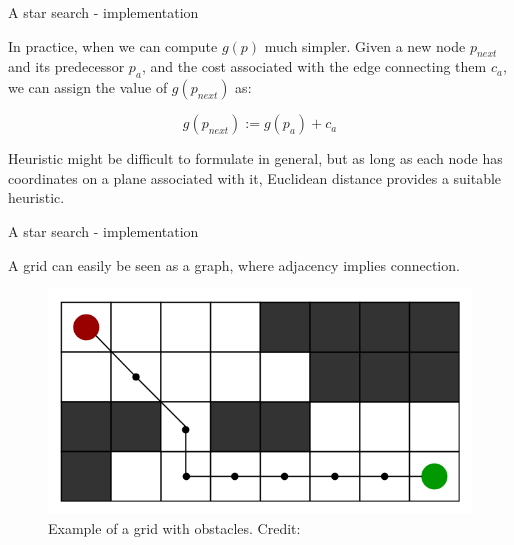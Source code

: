 \documentclass{beamer}
\begin{document}
\begin{frame}{A star search - implementation}
	\begin{flushleft}
		
		In practice, when we can compute $g(p)$ much simpler. Given a new node $p_{next}$ and its predecessor $p_a$, and the cost associated with the edge connecting them $c_a$, we can assign the value of $g(p_{next})$ as:
		
		\begin{equation}
			g(p_{next}) := g(p_a) + c_a
		\end{equation}
	
		Heuristic might be difficult to formulate in general, but as long as each node has coordinates on a plane associated with it, Euclidean distance provides a suitable heuristic.
		
	\end{flushleft}
\end{frame}



\begin{frame}{A star search - implementation}
	\begin{flushleft}
		
		A grid can easily be seen as a graph, where adjacency implies connection.
		
		\begin{figure}
			\centering
			\includegraphics[width=0.7\linewidth]{a_-search-algorithm-1}
			\caption{Example of a grid with obstacles. Credit: }
			\label{fig:a-search-algorithm-1}
		\end{figure}
		
		
	\end{flushleft}
\end{frame}




\myqrframe
\end{document}
